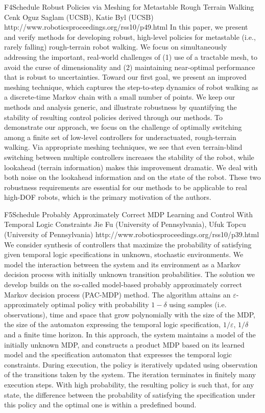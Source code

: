 \begin{spacing}{1.0}
\descriptionPaper
{F4}{Schedule}
{	
Robust Policies via Meshing for Metastable Rough Terrain Walking
}
{
Cenk Oguz Saglam (UCSB), Katie Byl (UCSB)
}
{
http://www.roboticsproceedings.org/rss10/p49.html
}
{
In this paper, we present and verify methods for developing robust, high-level policies for metastable (i.e., rarely falling) rough-terrain robot walking. We focus on simultaneously addressing the important, real-world challenges of (1) use of a tractable mesh, to avoid the curse of dimensionality and (2) maintaining near-optimal performance that is robust to uncertainties. Toward our first goal, we present an improved meshing technique, which captures the step-to-step dynamics of robot walking as a discrete-time Markov chain with a small number of points. We keep our methods and analysis generic, and illustrate robustness by quantifying the stability of resulting control policies derived through our methods. To demonstrate our approach, we focus on the challenge of optimally switching among a finite set of low-level controllers for underactuated, rough-terrain walking. Via appropriate meshing techniques, we see that even terrain-blind switching between multiple controllers increases the stability of the robot, while lookahead (terrain information) makes this improvement dramatic. We deal with both noise on the lookahead information and on the state of the robot. These two robustness requirements are essential for our methods to be applicable to real high-DOF robots, which is the primary motivation of the authors.
}


\clearpage
\descriptionPaper
{F5}{Schedule}
{	
Probably Approximately Correct MDP Learning and Control With Temporal Logic Constraints
}
{
Jie Fu (University of Pennsylvania), Ufuk Topcu (University of Pennsylvania)
}
{
http://www.roboticsproceedings.org/rss10/p39.html
}
{
We consider synthesis of controllers that maximize the probability of satisfying given temporal logic specifications in unknown, stochastic environments. We model the interaction between the system and its environment as a Markov decision process with initially unknown transition probabilities. The solution we develop builds on the so-called model-based probably approximately correct Markov decision process (PAC-MDP) method. The algorithm attains an $\varepsilon$-approximately optimal policy with probability $1-\delta$ using samples (i.e. observations), time and space that grow polynomially with the size of the MDP, the size of the automaton expressing the temporal logic specification, $1/\varepsilon$, $1/\delta$ and a finite time horizon. In this approach, the system maintains a model of the initially unknown MDP, and constructs a product MDP based on its learned model and the specification automaton that expresses the temporal logic constraints. During execution, the policy is iteratively updated using observation of the transitions taken by the system. The iteration terminates in finitely many execution steps. With high probability, the resulting policy is such that, for any state, the difference between the probability of satisfying the specification under this policy and the optimal one is within a predefined bound.
}





\end{spacing}
